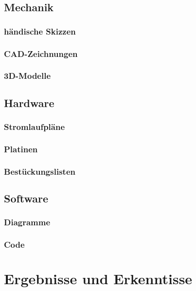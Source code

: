 \documentclass[11pt]{article}
\begin{document}
\subsection{Mechanik}
\subsubsection{händische Skizzen}
\subsubsection{CAD-Zeichnungen}
\subsubsection{3D-Modelle}

\subsection{Hardware}
\subsubsection{Stromlaufpläne}
\subsubsection{Platinen}
\subsubsection{Bestückungslisten}

\subsection{Software}
\subsubsection{Diagramme}
\subsubsection{Code}

\section{Ergebnisse und Erkenntisse}
\end{document}
